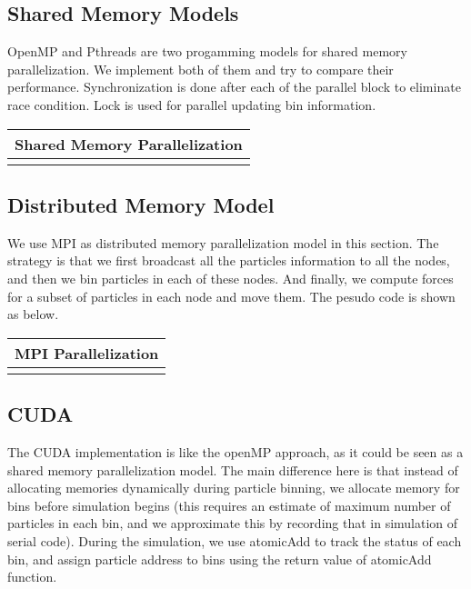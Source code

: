 \documentclass[11pt]{article}
\begin{document}
\subsection{Shared Memory Models}
OpenMP and Pthreads are two progamming models for shared memory parallelization. We implement both of them and try to 
compare their performance. Synchronization is done after each of the parallel block to eliminate race condition. Lock
is used for parallel updating bin information.

\begin{table}[htb]
  \centering
  \begin{tabular}{l}
    \hline
      Shared Memory Parallelization\\
    \hline
      \\
    \hline
  \end{tabular}
  \label{tab:shared_memory}
\end{table}

\subsection{Distributed Memory Model}
We use MPI \cite{mpi} as distributed memory parallelization model in this section. The strategy is that we first broadcast
all the particles information to all the nodes, and then we bin particles in each of these nodes. And finally, we 
compute forces for a subset of particles in each node and move them. The pesudo code is shown as below.

\begin{table}[htb]
  \centering
  \begin{tabular}{l}
    \hline
      MPI Parallelization\\
    \hline
      \\
    \hline
  \end{tabular}
  \label{tab:mpi_naive}
\end{table}

\subsection{CUDA}
The CUDA implementation is like the openMP approach, as it could be seen as a shared memory parallelization model.
The main difference here is that instead of allocating memories dynamically during particle binning, we allocate
memory for bins before simulation begins (this requires an estimate of maximum number of particles in each bin, and
we approximate this by recording that in simulation of serial code). During the simulation, we use atomicAdd to 
track the status of each bin, and assign particle address to bins using the return value of atomicAdd function.
\end{document}
